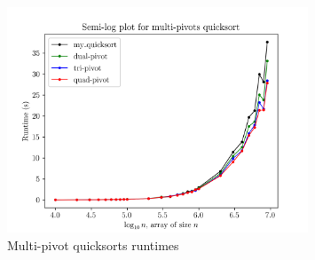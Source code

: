 \documentclass[titlepage, 12pt]{article}
\begin{document}
\begin{figure}[h]
  \centering
  \includegraphics[width=0.8\textwidth]{multp} 
  \caption{Multi-pivot quicksorts runtimes}
  \label{fig:multp}
\end{figure}
\end{document}
